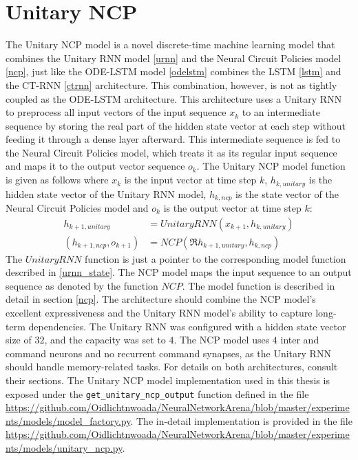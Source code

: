 \documentclass[draft,final]{vutinfth} %
\begin{document}
    \section{Unitary NCP} \label{uncp}
    The Unitary NCP model is a novel discrete-time machine learning model that combines the Unitary RNN model \ref{urnn} and the Neural Circuit Policies model \ref{ncp}, just like the ODE-LSTM model \ref{odelstm} combines the LSTM \ref{lstm} and the CT-RNN \ref{ctrnn} architecture.
    This combination, however, is not as tightly coupled as the ODE-LSTM architecture.
    This architecture uses a Unitary RNN to preprocess all input vectors of the input sequence $x_k$ to an intermediate sequence by storing the real part of the hidden state vector at each step without feeding it through a dense layer afterward.
    This intermediate sequence is fed to the Neural Circuit Policies model, which treats it as its regular input sequence and maps it to the output vector sequence $o_k$.
    The Unitary NCP model function is given as follows where $x_k$ is the input vector at time step $k$, $h_{k,unitary}$ is the hidden state vector of the Unitary RNN model, $h_{k,ncp}$ is the state vector of the Neural Circuit Policies model and $o_k$ is the output vector at time step $k$:
    \begin{align}
        h_{k+1,unitary} &= UnitaryRNN(x_{k+1}, h_{k,unitary}) \\
        (h_{k+1,ncp}, o_{k+1}) &= NCP(\Re{h_{k+1,unitary}}, h_{k,ncp})
    \end{align}
    The $UnitaryRNN$ function is just a pointer to the corresponding model function described in \ref{urnn_state}.
    The NCP model maps the input sequence to an output sequence as denoted by the function $NCP$. The model function is described in detail in section \ref{ncp}.
    The architecture should combine the NCP model's excellent expressiveness and the Unitary RNN model's ability to capture long-term dependencies.
    The Unitary RNN was configured with a hidden state vector size of $32$, and the capacity was set to $4$.
    The NCP model uses $4$ inter and command neurons and no recurrent command synapses, as the Unitary RNN should handle memory-related tasks.
    For details on both architectures, consult their sections.
    The Unitary NCP model implementation used in this thesis is exposed under the \texttt{get\_unitary\_ncp\_output} function defined in the file \url{https://github.com/Oidlichtnwoada/NeuralNetworkArena/blob/master/experiments/models/model_factory.py}.
    The in-detail implementation is provided in the file \url{https://github.com/Oidlichtnwoada/NeuralNetworkArena/blob/master/experiments/models/unitary_ncp.py}.
\end{document}
